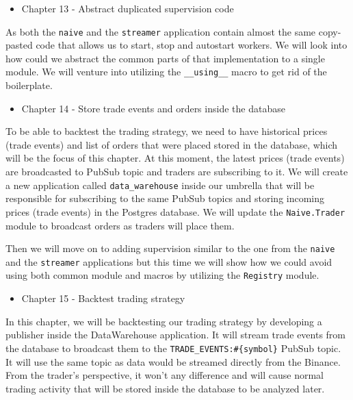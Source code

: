 \documentclass[
]{book}
\providecommand{\tightlist}{%
  \setlength{\itemsep}{0pt}\setlength{\parskip}{0pt}}
\begin{document}
\begin{itemize}
\tightlist
\item
  Chapter 13 - Abstract duplicated supervision code
\end{itemize}

As both the \texttt{naive} and the \texttt{streamer} application contain almost the same copy-pasted code that allows us to start, stop and autostart workers. We will look into how could we abstract the common parts of that implementation to a single module. We will venture into utilizing the \texttt{\_\_using\_\_} macro to get rid of the boilerplate.

\begin{itemize}
\tightlist
\item
  Chapter 14 - Store trade events and orders inside the database
\end{itemize}

To be able to backtest the trading strategy, we need to have historical prices (trade events) and list of orders that were placed stored in the database, which will be the focus of this chapter. At this moment, the latest prices (trade events) are broadcasted to PubSub topic and traders are subscribing to it. We will create a new application called \texttt{data\_warehouse} inside our umbrella that will be responsible for subscribing to the same PubSub topics and storing incoming prices (trade events) in the Postgres database. We will update the \texttt{Naive.Trader} module to broadcast orders as traders will place them.

Then we will move on to adding supervision similar to the one from the \texttt{naive} and the \texttt{streamer} applications but this time we will show how we could avoid using both common module and macros by utilizing the \texttt{Registry} module.

\begin{itemize}
\tightlist
\item
  Chapter 15 - Backtest trading strategy
\end{itemize}

In this chapter, we will be backtesting our trading strategy by developing a publisher inside the DataWarehouse application. It will stream trade events from the database to broadcast them to the \texttt{TRADE\_EVENTS:\#\{symbol\}} PubSub topic. It will use the same topic as data would be streamed directly from the Binance. From the trader's perspective, it won't any difference and will cause normal trading activity that will be stored inside the database to be analyzed later.
\end{document}
